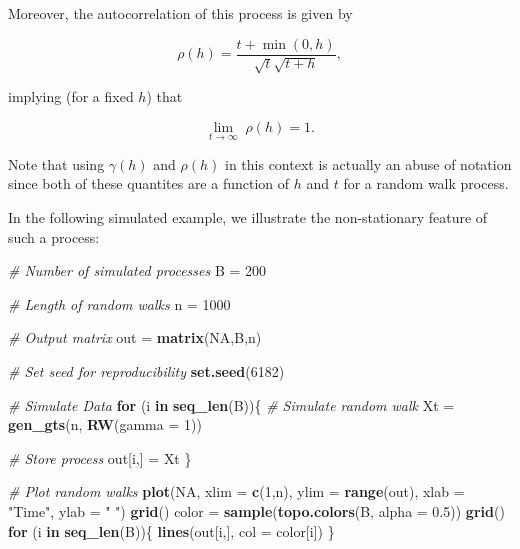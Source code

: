 \documentclass[]{book}
\newenvironment{Shaded}{\begin{snugshade}}{\end{snugshade}}
\newcommand{\CommentTok}[1]{\textcolor[rgb]{0.56,0.35,0.01}{\textit{#1}}}
\newcommand{\ControlFlowTok}[1]{\textcolor[rgb]{0.13,0.29,0.53}{\textbf{#1}}}
\newcommand{\DataTypeTok}[1]{\textcolor[rgb]{0.13,0.29,0.53}{#1}}
\newcommand{\DecValTok}[1]{\textcolor[rgb]{0.00,0.00,0.81}{#1}}
\newcommand{\FloatTok}[1]{\textcolor[rgb]{0.00,0.00,0.81}{#1}}
\newcommand{\KeywordTok}[1]{\textcolor[rgb]{0.13,0.29,0.53}{\textbf{#1}}}
\newcommand{\NormalTok}[1]{#1}
\newcommand{\OtherTok}[1]{\textcolor[rgb]{0.56,0.35,0.01}{#1}}
\newcommand{\StringTok}[1]{\textcolor[rgb]{0.31,0.60,0.02}{#1}}
\theoremstyle{definition}
\theoremstyle{definition}
\theoremstyle{definition}
\theoremstyle{remark}
\begin{document}
Moreover, the autocorrelation of this process is given by

\[\rho (h) = \frac{t + \min \left( {0,h} \right)}{\sqrt{t}\sqrt{t+h}},\]

implying (for a fixed \(h\)) that

\[\mathop {\lim }\limits_{t \to \infty } \; \rho(h) = 1.\]

Note that using \(\gamma (h)\) and \(\rho (h)\) in this context is
actually an abuse of notation since both of these quantites are a
function of \(h\) and \(t\) for a random walk process.

In the following simulated example, we illustrate the non-stationary
feature of such a process:

\begin{Shaded}
\begin{Highlighting}[]
\CommentTok{# Number of simulated processes}
\NormalTok{B =}\StringTok{ }\DecValTok{200}

\CommentTok{# Length of random walks}
\NormalTok{n =}\StringTok{ }\DecValTok{1000}

\CommentTok{# Output matrix}
\NormalTok{out =}\StringTok{ }\KeywordTok{matrix}\NormalTok{(}\OtherTok{NA}\NormalTok{,B,n)}

\CommentTok{# Set seed for reproducibility}
\KeywordTok{set.seed}\NormalTok{(}\DecValTok{6182}\NormalTok{)}

\CommentTok{# Simulate Data}
\ControlFlowTok{for}\NormalTok{ (i }\ControlFlowTok{in} \KeywordTok{seq_len}\NormalTok{(B))\{}
  \CommentTok{# Simulate random walk}
\NormalTok{  Xt =}\StringTok{ }\KeywordTok{gen_gts}\NormalTok{(n, }\KeywordTok{RW}\NormalTok{(}\DataTypeTok{gamma =} \DecValTok{1}\NormalTok{))}
  
  \CommentTok{# Store process}
\NormalTok{  out[i,] =}\StringTok{ }\NormalTok{Xt}
\NormalTok{\}}

\CommentTok{# Plot random walks}
\KeywordTok{plot}\NormalTok{(}\OtherTok{NA}\NormalTok{, }\DataTypeTok{xlim =} \KeywordTok{c}\NormalTok{(}\DecValTok{1}\NormalTok{,n), }\DataTypeTok{ylim =} \KeywordTok{range}\NormalTok{(out), }\DataTypeTok{xlab =} \StringTok{"Time"}\NormalTok{, }\DataTypeTok{ylab =} \StringTok{" "}\NormalTok{)}
\KeywordTok{grid}\NormalTok{()}
\NormalTok{color =}\StringTok{ }\KeywordTok{sample}\NormalTok{(}\KeywordTok{topo.colors}\NormalTok{(B, }\DataTypeTok{alpha =} \FloatTok{0.5}\NormalTok{))}
\KeywordTok{grid}\NormalTok{()}
\ControlFlowTok{for}\NormalTok{ (i }\ControlFlowTok{in} \KeywordTok{seq_len}\NormalTok{(B))\{}
  \KeywordTok{lines}\NormalTok{(out[i,], }\DataTypeTok{col =}\NormalTok{ color[i])}
\NormalTok{\}}


\end{Highlighting}
\end{Shaded}
\end{document}
